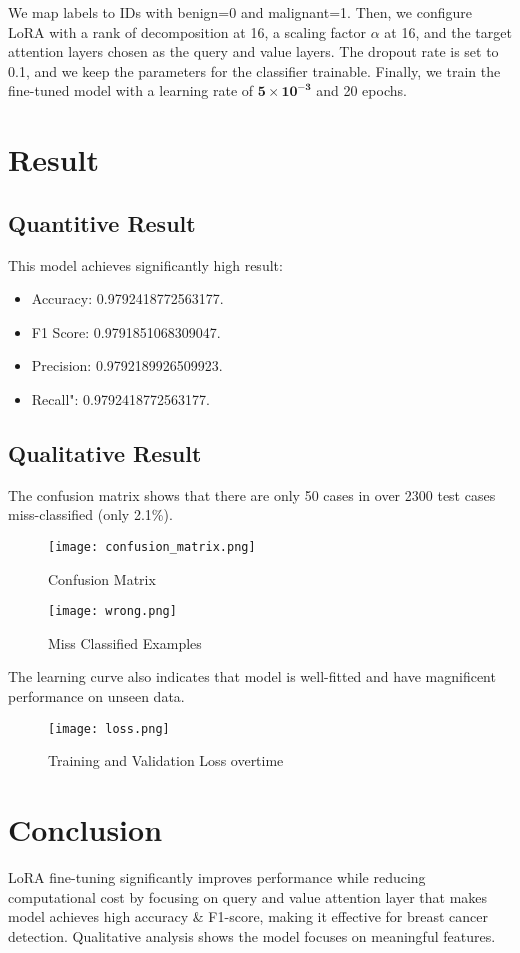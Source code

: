 \documentclass[twocolumn]{article}
\begin{document}
We map labels to IDs with benign=0 and malignant=1. Then, we configure LoRA\cite{hu2022lora} with a rank of decomposition at 16, a scaling factor $\alpha$ at 16, and the target attention layers chosen as the query and value layers. The dropout rate is set to 0.1, and we keep the parameters for the classifier trainable. Finally, we train the fine-tuned model with a learning rate of $\mathbf{5 \times 10^{-3}}$ and 20 epochs.

\section{Result}
\subsection{Quantitive Result}
This model achieves significantly high result:
\begin{itemize}
    \setlength{\itemsep}{0pt}
    \item Accuracy: 0.9792418772563177.
    \item F1 Score: 0.9791851068309047.
    \item Precision: 0.9792189926509923.
    \item Recall": 0.9792418772563177.
\end{itemize}
\subsection{Qualitative Result}
The confusion matrix shows that there are only 50 cases in over 2300 test cases miss-classified (only 2.1\%).

\begin{figure}[H]
    \centering
    \texttt{[image: confusion\_matrix.png]}
    \caption{Confusion Matrix}
    \label{fig:enter-label}
\end{figure}

\begin{figure}[H]
    \centering
    \texttt{[image: wrong.png]}
    \caption{Miss Classified Examples}
    \label{fig:enter-label}
\end{figure}

The learning curve also indicates that model is well-fitted and have magnificent performance on unseen data.

\begin{figure}[H]
    \centering
    \texttt{[image: loss.png]}
    \caption{Training and Validation Loss overtime}
    \label{fig:enter-label}
\end{figure}

\section{Conclusion}
LoRA fine-tuning significantly improves performance while reducing computational cost by focusing on query and value attention layer that makes model achieves high accuracy \& F1-score, making it effective for breast cancer detection. Qualitative analysis shows the model focuses on meaningful features. 

\printbibliography
{}
\end{document}
